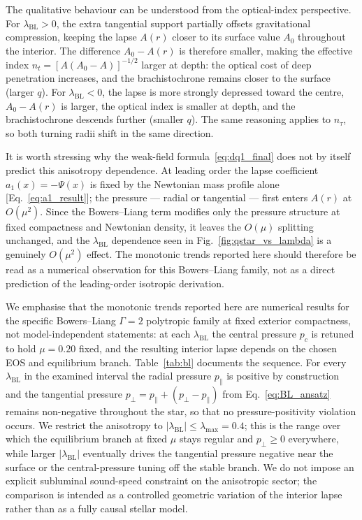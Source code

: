 \documentclass[
  aps,
  prd,
  twocolumn,
  nofootinbib,
  superscriptaddress,
  longbibliography
]{revtex4-2}
\begin{document}
The qualitative behaviour can be understood from the optical-index perspective.
For $\lambda_{\mathrm{BL}}>0$, the extra tangential support partially offsets gravitational compression, keeping the lapse $A(r)$ closer to its surface value $A_0$ throughout the interior.
The difference $A_0-A(r)$ is therefore smaller, making the effective index $n_t = [A(A_0-A)]^{-1/2}$ larger at depth: the optical cost of deep penetration increases, and the brachistochrone remains closer to the surface (larger $q$). For $\lambda_{\mathrm{BL}}<0$, the lapse is more strongly depressed toward the centre, $A_0-A(r)$ is larger, the optical index is smaller at depth, and the brachistochrone descends further (smaller $q$).
The same reasoning applies to $n_\tau$, so both turning radii shift in the same direction.

It is worth stressing why the weak-field formula~\eqref{eq:dq1_final}
does not by itself predict this anisotropy dependence. At leading order
the lapse coefficient $a_1(x)=-\Psi(x)$ is fixed by the Newtonian mass
profile alone [Eq.~\eqref{eq:a1_result}]; the pressure --- radial or
tangential --- first enters $A(r)$ at $O(\mu^2)$. Since the
Bowers--Liang term modifies only the pressure structure at fixed
compactness and Newtonian density, it leaves the $O(\mu)$ splitting
unchanged, and the $\lambda_{\mathrm{BL}}$ dependence seen in
Fig.~\ref{fig:qstar_vs_lambda} is a genuinely $O(\mu^2)$ effect. The
monotonic trends reported here should therefore be read as a numerical
observation for this Bowers--Liang family, not as a direct prediction of
the leading-order isotropic derivation.

We emphasise that the monotonic trends reported here are numerical
results for the specific Bowers--Liang $\Gamma=2$ polytropic family at
fixed exterior compactness, not model-independent statements: at each
$\lambda_{\mathrm{BL}}$ the central pressure $p_c$ is retuned to hold
$\mu=0.20$ fixed, and the resulting interior lapse depends on the chosen
EOS and equilibrium branch. Table~\ref{tab:bl} documents the sequence.
For every $\lambda_{\mathrm{BL}}$ in the examined interval the radial
pressure $p_\parallel$ is positive by construction and the tangential
pressure $p_\perp=p_\parallel+(p_\perp-p_\parallel)$ from
Eq.~\eqref{eq:BL_ansatz} remains non-negative throughout the star, so
that no pressure-positivity violation occurs. We restrict the anisotropy
to $|\lambda_{\mathrm{BL}}|\le\lambda_{\max}=0.4$; this is the range over
which the equilibrium branch at fixed $\mu$ stays regular and
$p_\perp\ge0$ everywhere, while larger $|\lambda_{\mathrm{BL}}|$
eventually drives the tangential pressure negative near the surface or
the central-pressure tuning off the stable branch. We do not impose an
explicit subluminal sound-speed constraint on the anisotropic sector;
the comparison is intended as a controlled geometric variation of the
interior lapse rather than as a fully causal stellar model.
\end{document}
